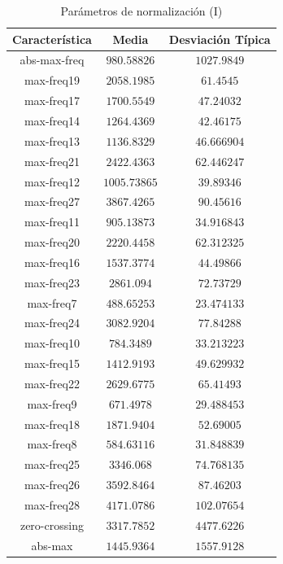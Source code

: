 \documentclass[12pt]{article}
\begin{document}
\begin{table}
	\caption{Parámetros de normalización (I)}
	\centering
		\begin{tabular}{||c c c||}
			\hline
			Característica & Media & Desviación Típica \\ [0.5ex]
			\hline\hline
			abs-max-freq & $980.58826$ & $1027.9849$ \\
			\hline
			max-freq19 & $2058.1985$ & $61.4545$ \\
			\hline
			max-freq17 & $1700.5549$ & $47.24032$ \\
			\hline
			max-freq14 & $1264.4369$ & $42.46175$ \\
			\hline
			max-freq13 & $1136.8329$ & $46.666904$ \\
			\hline
			max-freq21 & $2422.4363$ & $62.446247$ \\
			\hline
			max-freq12 & $1005.73865$ & $39.89346$ \\
			\hline
			max-freq27 & $3867.4265$ & $90.45616$ \\
			\hline
			max-freq11 & $905.13873$ & $34.916843$ \\
			\hline
			max-freq20 & $2220.4458$ & $62.312325$ \\
			\hline
			max-freq16 & $1537.3774$ & $44.49866$ \\
			\hline
			max-freq23 & $2861.094$ & $72.73729$ \\
			\hline
			max-freq7 & $488.65253$ & $23.474133$ \\
			\hline
			max-freq24 & $3082.9204$ & $77.84288$ \\
			\hline
			max-freq10 & $784.3489$ & $33.213223$ \\
			\hline
			max-freq15 & $1412.9193$ & $49.629932$ \\
			\hline
			max-freq22 & $2629.6775$ & $65.41493$ \\
			\hline
			max-freq9 & $671.4978$ & $29.488453$ \\
			\hline
			max-freq18 & $1871.9404$ & $52.69005$ \\
			\hline
			max-freq8 & $584.63116$ & $31.848839$ \\
			\hline
			max-freq25 & $3346.068$ & $74.768135$ \\
			\hline
			max-freq26 & $3592.8464$ & $87.46203$ \\
			\hline
			max-freq28 & $4171.0786$ & $102.07654$ \\
			\hline
			zero-crossing & $3317.7852$ & $4477.6226$ \\
			\hline
			abs-max & $1445.9364$ & $1557.9128$ \\
			\hline
			
		\end{tabular}
	\label{Tab:Features_5_1}
\end{table}
\end{document}
